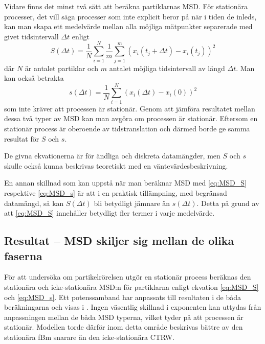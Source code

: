 Vidare finns det minst två sätt att beräkna partiklarnas MSD. För stationära processer, det vill säga processer som inte explicit beror på när i tiden de inleds, kan man skapa ett medelvärde mellan alla möjliga mätpunkter separerade med givet tidsintervall $\Delta{t}$ enligt
\begin{equation} \label{eq:MSD_S}
    S(\Delta t)= \frac{1}{N}\sum^N_{i=1}\frac{1}{m}\sum^m_{j=1}(x_i(t_j+\Delta t)-x_i(t_j))^2
\end{equation} 
där $N$ är antalet partiklar och $m$ antalet möjliga tidsintervall av längd $\Delta t$. 
Man kan också betrakta
\begin{equation} \label{eq:MSD_s}%
    s(\Delta t)= \frac{1}{N}\sum^N_{i=1}(x_i(\Delta t)-x_i(0))^2
\end{equation} 
som inte kräver att processen är stationär.
Genom att jämföra resultatet mellan dessa två typer av MSD kan man avgöra om processen är stationär. Eftersom en stationär process är oberoende av tidstranslation och därmed borde ge samma resultat för $S$ och $s$. 

De givna ekvationerna är för ändliga och diskreta datamängder, men $S$ och $s$ skulle också kunna beskrivas teoretiskt med en väntevärdesbeskrivning.

En annan skillnad som kan uppstå när man beräknar MSD med \eqref{eq:MSD_S} respektive \eqref{eq:MSD_s} är att i en praktisk tillämpning, med begränsad datamängd, så kan $S(\Delta{t})$ bli betydligt jämnare än $s(\Delta{t})$. Detta på grund av att \eqref{eq:MSD_S} innehåller betydligt fler termer i varje medelvärde. 


\subsection{Resultat -- MSD skiljer sig mellan de olika faserna}

För att undersöka om partikelrörelsen utgör en stationär process beräknas den stationära och icke-stationära MSD:n för partiklarna enligt ekvation \eqref{eq:MSD_S} och \eqref{eq:MSD_s}. Ett potenssamband har anpassats till resultaten i de båda beräkningarna och visas i . 
Ingen väsentlig skillnad i exponenten kan uttydas från anpassningen mellan de båda MSD typerna, vilket tyder på att processen är stationär. Modellen torde därför inom detta område beskrivas bättre av den stationära fBm snarare än den icke-stationära CTRW.

